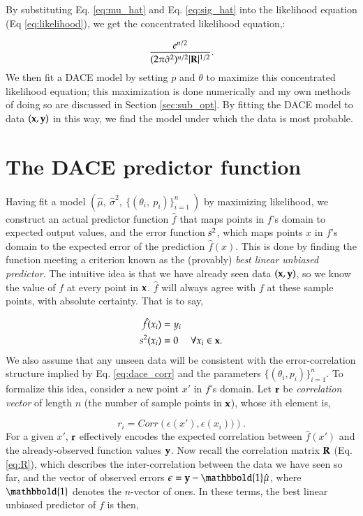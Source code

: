 By substituting Eq. \ref{eq:mu_hat} and Eq. \ref{eq:sig_hat} into the likelihood equation (Eq \ref{eq:likelihood}), we get the concentrated likelihood equation,:

\begin{equation} \label{eq:conc_likelihood}
\frac{e^{n/2}}
  {(2\pi\hat{\sigma}^2)^{n/2}|\mathbf{R}|^{1/2}}.
\end{equation}
We then fit a DACE model by setting $p$ and $\theta$ to maximize this concentrated likelihood equation; this maximization is done numerically and my own methods of doing so are discussed in Section \ref{sec:sub_opt}. By fitting the DACE model to data $(\mathbf{x},\mathbf{y})$ in this way, we find the model under which the data is most probable.

\section{The DACE predictor function}
Having fit a model $(\hat{\mu},\ \hat{\sigma}^2,\ \{(\theta_i,\ p_i)\}_{i=1}^n\ )$ by maximizing likelihood, we construct an actual predictor function $\hat{f}$ that maps points in $f$'s domain to expected output values, and the error function $s^2$, which maps points $x$ in $f$'s domain to the expected error of the prediction $\hat{f}(x)$. This is done by finding the function meeting a criterion known as the (provably) \emph{best linear unbiased predictor}. The intuitive idea is that we have already seen data $(\mathbf{x},\mathbf{y})$, so we know the value of $f$ at every point in $\mathbf{x}$. $\hat{f}$ will always agree with $f$ at these sample points, with absolute certainty. That is to say,

\begin{align}
\hat{f}(x_i)&=y_i\\
s^2(x_i)&=0\ \ \ \ \ \forall x_i \in \mathbf{x}.
\end{align}
We also assume that any unseen data will be consistent with the error-correlation structure implied by Eq. \ref{eq:dace_corr} and the parameters $\{(\theta_i,p_i)\}_{i=1}^n$. To formalize this idea, consider a new point $x'$ in $f$'s domain. Let $\mathbf{r}$ be \emph{correlation vector} of length $n$ (the number of sample points in $\mathbf{x}$), whose $i$th element is,

\begin{equation}\label{eq:r}
r_i = Corr\left( \epsilon(x'),\epsilon(x_i))\right).
\end{equation}
For a given $x'$, $\mathbf{r}$ effectively encodes the expected correlation between $\hat{f}(x')$ and the already-observed function values $\mathbf{y}$. Now recall the correlation matrix $\mathbf{R}$ (Eq. \ref{eq:R}), which describes the inter-correlation between the data we have seen so far, and the vector of observed errors $\mb{\epsilon} = \Y - \mathbbold{1}\hat{\mu}$, where $\mathbbold{1}$ denotes the $n$-vector of ones. In these terms, the best linear unbiased predictor of $f$ is then,

